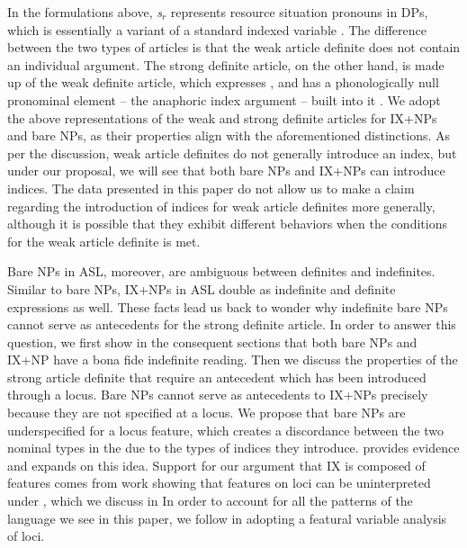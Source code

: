 \documentclass[output=paper,
modfonts
]{langscibook}
\begin{document}
In the formulations above, \textit{s$_r$} represents resource situation pronouns in DPs, which is essentially a variant of a standard indexed variable \citep[95]{Schwarz2009}. The difference between the two types of articles is that the weak article definite does not contain an individual argument. The strong definite article, on the other hand, is made up of the weak definite article, which expresses , and has a phonologically null pronominal element -- the anaphoric index argument -- built into it \citep[258]{Schwarz2009}. We adopt the above representations of the weak and strong definite articles for IX+NPs and bare NPs, as their properties align with the aforementioned distinctions. As per the discussion, weak article definites do not generally introduce an index, but under our proposal, we will see that both bare NPs and IX+NPs can introduce indices. The data presented in this paper do not allow us to make a claim regarding the introduction of indices for weak article definites more generally, although it is possible that they exhibit different behaviors when the conditions for the weak article definite is met. 


Bare NPs in ASL, moreover, are ambiguous between definites and indefinites. Similar to bare NPs, IX+NPs in ASL double as indefinite and definite expressions as well. These facts lead us back to wonder why indefinite bare NPs cannot serve as antecedents for the strong definite article. In order to answer this question, we first show in the consequent sections that both bare NPs and IX+NP have a bona fide indefinite reading. Then we discuss the properties of the strong article definite that require an antecedent which has been introduced through a locus. Bare NPs cannot serve as antecedents to IX+NPs precisely because they are not specified at a locus. We propose that bare NPs are underspecified for a locus feature, which creates a discordance between the two nominal types in the  due to the types of indices they introduce.  provides evidence and expands on this idea. Support for our argument that IX is composed of features comes from work showing that features on loci can be uninterpreted under  \citep{Kuhn2015}, which we discuss in  In order to account for all the patterns of the language we see in this paper, we follow \citet{Schlenker2014} in adopting a featural variable analysis of loci. 
\end{document}

